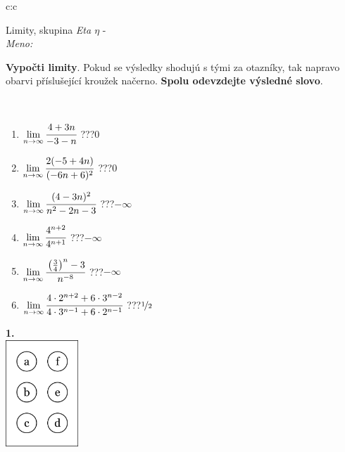\documentclass[10pt]{report}
\begin{document}
\begin{tabular}{c:c}
\begin{minipage}[c][104.5mm][t]{0.5\linewidth}
\begin{center}
\vspace{7mm}
{\huge Limity, skupina \textit{Eta $\eta$} -}\\[5mm]
\textit{Meno:}\phantom{xxxxxxxxxxxxxxxxxxxxxxxxxxxxxxxxxxxxxxxxxxxxxxxxxxxxxxxxxxxxxxxxx}\\[5mm]
\begin{minipage}{0.95\linewidth}
\begin{center}
\textbf{Vypočti limity}. Pokud se výsledky shodujú s tými za otazníky, tak napravo\\obarvi příslušející kroužek načerno. \textbf{Spolu odevzdejte výsledné slovo}.
\end{center}
\end{minipage}
\\[1mm]
\begin{minipage}{0.79\linewidth}
\begin{center}
\begin{varwidth}{\linewidth}
\begin{enumerate}
\normalsize
\item $\lim\limits_{n\to\infty}\cfrac{4+3n}{-3-n}$\quad \dotfill\; ???\;\dotfill \quad $0$
\item $\lim\limits_{n\to\infty}\cfrac{2(-5+4n)}{(-6n+6)^2}$\quad \dotfill\; ???\;\dotfill \quad $0$
\item $\lim\limits_{n\to\infty}\cfrac{(4-3n)^2}{n^2-2n-3}$\quad \dotfill\; ???\;\dotfill \quad $-\infty$
\item $\lim\limits_{n\to\infty}\cfrac{4^{n+2}}{4^{n+1}}$\quad \dotfill\; ???\;\dotfill \quad $-\infty$
\item $\lim\limits_{n\to\infty}\cfrac{\left(\frac{3}{4}\right)^n -3}{n^{-8}}$\quad \dotfill\; ???\;\dotfill \quad $-\infty$
\item $\lim\limits_{n\to\infty}\cfrac{4\cdot 2^{n+2}+6\cdot 3^{n-2}}{4\cdot 3^{n-1}+6\cdot 2^{n-1}}$\quad \dotfill\; ???\;\dotfill \quad $\nicefrac{1}{2}$
\end{enumerate}
\end{varwidth}
\end{center}
\end{minipage}
\begin{minipage}{0.20\linewidth}
\begin{center}
{\Huge\bfseries 1.} \\[2mm]
\includegraphics[height=40mm]{../images/braille.png}

\end{center}
\end{minipage}
\end{center}
\end{minipage}
\end{tabular}
\end{document}
